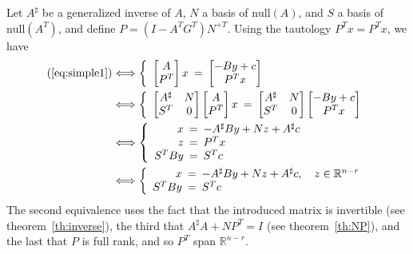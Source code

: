 \documentclass[]{article}
\theoremstyle{definition}
\newcommand{\BIN}{\begin{bmatrix}}
\newcommand{\BOUT}{\end{bmatrix}}
\begin{document}
Let $A^\sharp$ be a generalized inverse of $A$, $N$ a basis of $\mathrm{null}(A)$, and $S$ a basis of $\mathrm{null}(A^T)$, and define $P = (I-A^T G^T) N^{+T}$. Using the tautology $P^T x = P^T x$, we have
\begin{align*}
  \mathrm{(\ref{eq:simple1})} &\Longleftrightarrow 
	\left\{\begin{array}{rcl}
	  \BIN A \\ P^T\BOUT x \hspace{-5pt}&=&\hspace{-5pt} \BIN -By + c \\ P^T x\BOUT
	\end{array}\right.\\
	&\Longleftrightarrow 
	\left\{\begin{array}{rcl}
	  \BIN A^{\sharp} & N \\ S^T & 0 \BOUT \BIN A \\ P^T\BOUT x \hspace{-5pt}&=&\hspace{-5pt} \BIN A^{\sharp} & N \\ S^T & 0 \BOUT \BIN -By + c \\ P^T x\BOUT
	\end{array}\right.\\
	&\Longleftrightarrow 
	\left\{\begin{array}{rcl}
	  x \hspace{-5pt}&=&\hspace{-5pt}  -A^{\sharp}By + N z + A^{\sharp}c \\ 
		z \hspace{-5pt}&=&\hspace{-5pt} P^T x\\
		S^T By \hspace{-5pt}&=&\hspace{-5pt} S^T c
	\end{array}\right.\\
	&\Longleftrightarrow 
	\left\{\begin{array}{rcl}
	  x \hspace{-5pt}&=&\hspace{-5pt}  -A^{\sharp}By + N z + A^{\sharp}c, \quad z \in \mathbb{R}^{n-r} \\ 
		S^T By \hspace{-5pt}&=&\hspace{-5pt} S^T c
	\end{array}\right.
\end{align*}
The second equivalence uses the fact that the introduced matrix is invertible (see theorem~\ref{th:inverse}), the third that $A^{\sharp}A + NP^T = I$ (see theorem~\ref{th:NP}), and the last that $P$ is full rank, and so $P^T$ span $\mathbb{R}^{n-r}$. 
\end{document}
